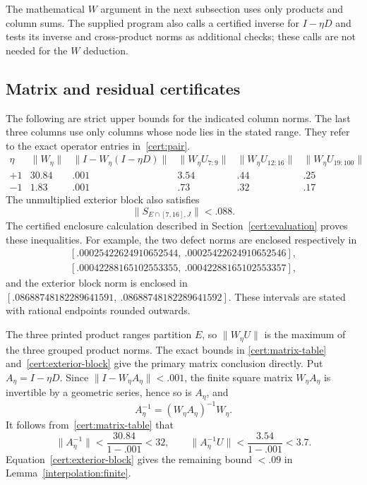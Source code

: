 The mathematical $W$ argument in the next subsection uses only products
and column sums.  The supplied program also calls a certified inverse
for $I-\eta D$ and tests its inverse and cross-product norms as
additional checks; these calls are not needed for the $W$ deduction.

\subsection{Matrix and residual certificates}\label{cert:matrix-bounds}

The following are strict upper bounds
for the indicated column norms.  The last three columns use only
columns whose node lies in the stated range.  They refer to the exact
operator entries in~\eqref{cert:pair}.
\begin{equation}\label{cert:matrix-table}
\begin{array}{c|cc|ccc}
 \eta&
 \|W_\eta\|&
 \|I-W_\eta(I-\eta D)\|&
 \|W_\eta U_{7:9}\|&
 \|W_\eta U_{12:16}\|&
 \|W_\eta U_{19:100}\|\\ \hline
 +1&30.84&.001&3.54&.44&.25\\
 -1&1.83&.001&.73&.32&.17
\end{array}
\end{equation}
The unmultiplied exterior block also satisfies
\begin{equation}\label{cert:exterior-block}
 \|S_{E\cap[7,16],J}\|<.088.
\end{equation}
The certified enclosure calculation described in
Section~\ref{cert:evaluation} proves these inequalities.
For example, the two defect norms are enclosed respectively in
\[
\begin{gathered}
 [.00025422624910652544,\ .00025422624910652546],\\
 [.00042288165102553355,\ .00042288165102553357],
\end{gathered}
\]
and the exterior block norm is enclosed in
$[.08688748182289641591,\ .08688748182289641592]$.
These intervals are stated with rational endpoints rounded outwards.

The three printed product ranges partition $E$, so $\|W_\eta U\|$ is the
maximum of the three grouped product norms.  The exact bounds in
\eqref{cert:matrix-table} and~\eqref{cert:exterior-block} give the primary
matrix conclusion directly.  Put $A_\eta=I-\eta D$.
Since $\|I-W_\eta A_\eta\|<.001$, the finite square
matrix $W_\eta A_\eta$ is invertible by a geometric series, hence so
is $A_\eta$, and
\[
 A_\eta^{-1}=(W_\eta A_\eta)^{-1}W_\eta.
\]
It follows from~\eqref{cert:matrix-table} that
\[
 \|A_\eta^{-1}\|<\frac{30.84}{1-.001}<32,\qquad
 \|A_\eta^{-1}U\|<\frac{3.54}{1-.001}<3.7.
\]
Equation~\eqref{cert:exterior-block} gives the remaining bound $<.09$
in Lemma~\ref{interpolation:finite}.

